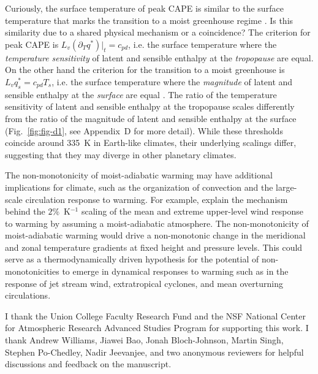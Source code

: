 \documentclass[]{ametsocV6.1}
\begin{document}
Curiously, the surface temperature of peak CAPE \citep[$\approx335$~K,][]{romps2016} is similar to the surface temperature that marks the transition to a moist greenhouse regime \citep[$\approx335$~K,][]{komabayasi1967, ingersoll1969, kasting1988}. Is this similarity due to a shared physical mechanism or a coincidence? The criterion for peak CAPE is $L_v(\partial_T q^*)|_t=c_{pd}$, i.e. the surface temperature where the \textit{temperature sensitivity} of latent and sensible enthalpy at the \textit{tropopause} are equal. On the other hand the criterion for the transition to a moist greenhouse is $L_vq_s^* = c_{pd}T_s$, i.e. the surface temperature where the \textit{magnitude} of latent and sensible enthalpy at the \textit{surface} are equal \citep{wordsworth2013}. The ratio of the temperature sensitivity of latent and sensible enthalpy at the tropopause scales differently from the ratio of the magnitude of latent and sensible enthalpy at the surface (Fig.~\ref{fig:fig-d1}, see Appendix~D for more detail). While these thresholds coincide around 335~K in Earth-like climates, their underlying scalings differ, suggesting that they may diverge in other planetary climates.

The non-monotonicity of moist-adiabatic warming may have additional implications for climate, such as the organization of convection and the large-scale circulation response to warming. For example, \cite{shaw2025a}  explain the mechanism behind the $2\%$~K$^{-1}$ scaling of the mean and extreme upper-level wind response to warming by assuming a moist-adiabatic atmosphere. The non-monotonicity of moist-adiabatic warming would drive a non-monotonic change in the meridional and zonal temperature gradients at fixed height and pressure levels. This could serve as a thermodynamically driven hypothesis for the potential of non-monotonicities to emerge in dynamical responses to warming such as in the response of jet stream wind, extratropical cyclones, and mean overturning circulations.

\acknowledgments
I thank the Union College Faculty Research Fund and the NSF National Center for Atmospheric Research Advanced Studies Program for supporting this work. I thank Andrew Williams, Jiawei Bao, Jonah Bloch-Johnson, Martin Singh, Stephen Po-Chedley, Nadir Jeevanjee, and two anonymous reviewers for helpful discussions and feedback on the manuscript.
\end{document}

